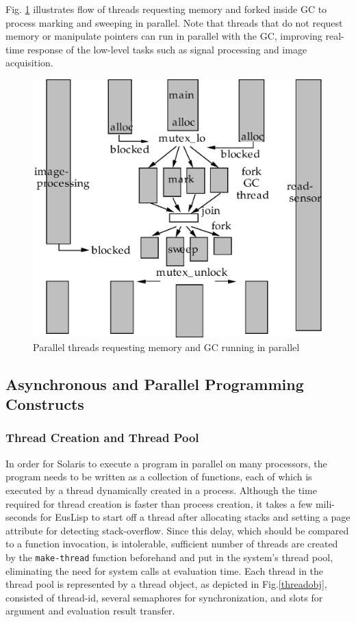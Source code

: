 Fig. \ref{parathreads} illustrates flow of threads requesting memory and forked inside
GC to process marking and sweeping in parallel.
Note that threads that do not request memory or manipulate pointers
can run in parallel with the GC,
improving real-time response of the low-level tasks such as signal
processing and image acquisition.

\begin{figure}
\begin{center}
\includegraphics[width=120mm]{fig/parathreads.ps}
\caption{Parallel threads requesting memory and GC running in parallel}\label{parathreads}
\end{center}
\end{figure}

\subsection{Asynchronous and Parallel Programming Constructs}
\subsubsection{Thread Creation and Thread Pool}
In order for Solaris to execute a program in parallel on many
processors, the program needs to be written as a collection
of functions, each of which is executed by a thread dynamically
created in a process.  Although the time required for thread
creation is faster than process creation, it takes a few
mili-seconds for EusLisp to start off a thread after allocating
stacks and setting a page attribute for detecting stack-overflow.
Since this delay, which should be compared to a function invocation,
is intolerable, sufficient number of threads are created by
the {\tt make-thread} function beforehand and put in 
the system's thread pool,
eliminating the need for system calls at evaluation time.
Each thread in the thread pool is represented by a thread object,
as depicted in Fig.\ref{threadobj},
consisted of thread-id, several semaphores for synchronization,
and slots for argument and evaluation result transfer.

